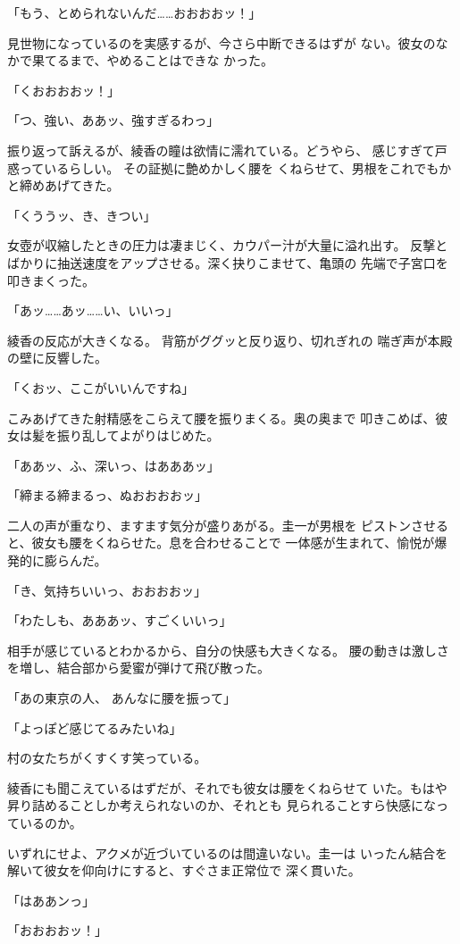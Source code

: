 ﻿\documentclass[
    book,tate,
    line_length=30zw,
    jafontsize=12pt,
    paper=b5j,
    landscape,
    ]{jlreq}
\begin{document}
「もう、とめられないんだ……おおおおッ！」

見世物になっているのを実感するが、今さら中断できるはずが
ない。彼女のなかで果てるまで、やめることはできな かった。

「くおおおおッ！」

「つ、強い、ああッ、強すぎるわっ」

振り返って訴えるが、綾香の瞳は欲情に濡れている。どうやら、
感じすぎて戸惑っているらしい。 その証拠に艶めかしく腰を
くねらせて、男根をこれでもかと締めあげてきた。

「くううッ、き、きつい」

女壺が収縮したときの圧力は凄まじく、カウパー汁が大量に溢れ出す。
反撃とばかりに抽送速度をアップさせる。深く抉りこませて、亀頭の
先端で子宮口を叩きまくった。

「あッ……あッ……い、いいっ」

綾香の反応が大きくなる。 背筋がググッと反り返り、切れぎれの
喘ぎ声が本殿の壁に反響した。

「くおッ、ここがいいんですね」

こみあげてきた射精感をこらえて腰を振りまくる。奥の奥まで
叩きこめば、彼女は髪を振り乱してよがりはじめた。

「ああッ、ふ、深いっ、はあああッ」

「締まる締まるっ、ぬおおおおッ」

二人の声が重なり、ますます気分が盛りあがる。圭一が男根を
ピストンさせると、彼女も腰をくねらせた。息を合わせることで
一体感が生まれて、愉悦が爆発的に膨らんだ。

「き、気持ちいいっ、おおおおッ」

「わたしも、あああッ、すごくいいっ」

相手が感じているとわかるから、自分の快感も大きくなる。
腰の動きは激しさを増し、結合部から愛蜜が弾けて飛び散った。

「あの東京の人、 あんなに腰を振って」

「よっぽど感じてるみたいね」

村の女たちがくすくす笑っている。

綾香にも聞こえているはずだが、それでも彼女は腰をくねらせて
いた。もはや昇り詰めることしか考えられないのか、それとも
見られることすら快感になっているのか。

いずれにせよ、アクメが近づいているのは間違いない。圭一は
いったん結合を解いて彼女を仰向けにすると、すぐさま正常位で
深く貫いた。

「はああンっ」

「おおおおッ！」
\end{document}
